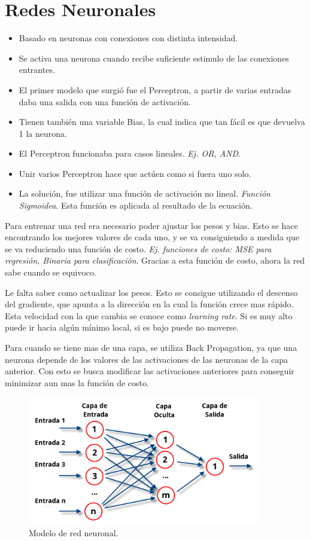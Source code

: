 \documentclass[titlepage,a4paper]{article}
\begin{document}
\newpage

\section{Redes Neuronales}
\begin{itemize}
    \item Basado en neuronas con conexiones con distinta intensidad.
    \item Se activa una neurona cuando recibe suficiente estimulo de las conexiones entrantes.
    \item El primer modelo que surgió fue el Perceptron, a partir de varias entradas daba una salida con una función de activación.
    \item Tienen también una variable Bias, la cual indica que tan fácil es que devuelva 1 la neurona.
    \item El Perceptron funcionaba para casos lineales. \textit{Ej. OR, AND}. 
    \item Unir varios Perceptron hace que actúen como si fuera uno solo.
    \item La solución, fue utilizar una función de activación no lineal. \textit{Función Sigmoidea}. Esta función es aplicada al resultado de la ecuación.
\end{itemize}

Para entrenar una red era necesario poder ajustar los pesos y bias. Esto se hace encontrando los mejores valores de cada uno, y se va consiguiendo a medida que se va reduciendo una función de costo. \textit{Ej. funciones de costo: MSE para regresión, Binaria para clasificación}. Gracias a esta función de costo, ahora la red sabe cuando se equivoco. 

Le falta saber como actualizar los pesos. Esto se consigue utilizando el descenso del gradiente, que apunta a la dirección en la cual la función crece mas rápido. Esta velocidad con la que cambia se conoce como \textit{learning rate}. Si es muy alto puede ir hacia algún mínimo local, si es bajo puede no moverse.

Para cuando se tiene mas de una capa, se utiliza Back Propagation, ya que una neurona depende de los valores de las activaciones de las neuronas de la capa anterior. Con esto se busca modificar las activaciones anteriores para conseguir minimizar aun mas la función de costo.

\begin{figure}[!htb]
    \centering
    \includegraphics[width=0.9\textwidth]{imagenesResumen/RedNeuronal.png}
    \caption{Modelo de red neuronal.}
\end{figure}
\end{document}
